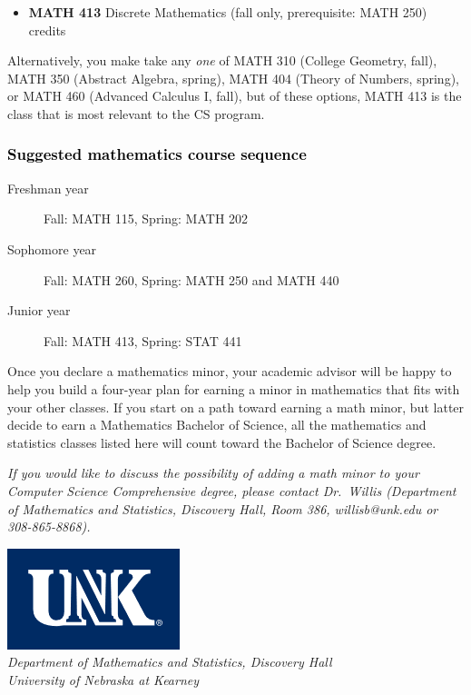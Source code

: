 \documentclass[9pt]{article}
\newenvironment{mypar}[2]
   {\begin{list}{}%
     {\setlength\leftmargin{#1}
     \setlength\rightmargin{#2}}
     \item[]}
   {\end{list}}
\begin{document}
\begin{itemize}
\item \textbf{MATH 413} Discrete Mathematics  (fall only, prerequisite: MATH 250) credits
\end{itemize}
\vspace{-0.1in}
\begin{mypar}{0.5cm}{0.5cm}
Alternatively, you make take any \emph{one} of MATH 310 (College Geometry, fall),  MATH 350 (Abstract Algebra, spring),  MATH 404  (Theory of Numbers, spring), or
MATH 460 (Advanced Calculus I, fall), but of these options, MATH 413 is  the class that is most relevant to the CS program.  \end{mypar}


\noindent


\subsubsection*{\textcolor{black}{Suggested mathematics course sequence}}

\begin{description}
   \item[\phantom{xxx} Freshman year] Fall: MATH 115, Spring:  MATH 202
      \item[\phantom{xxx} Sophomore year]  Fall: MATH 260,  Spring: MATH 250  and MATH 440
     \item[\phantom{xxx} Junior year]  Fall: MATH 413,  Spring: STAT 441
 \end{description}
  \vspace{0.1in}

 \noindent Once you declare a mathematics minor, your academic advisor will be happy to help you build a four-year plan for earning a minor in mathematics that fits with your other classes.  If you start on a path toward earning a math minor, but latter decide to earn a  Mathematics Bachelor of Science, all the mathematics and statistics  classes listed here will count toward the Bachelor of Science degree.

   \vspace{0.1in}

\noindent \textcolor{unkblue}{\emph{If you would like to discuss the possibility of  adding a math minor to your Computer Science Comprehensive degree, please contact \mbox{Dr.\ Willis} (Department of Mathematics and Statistics,  Discovery Hall, Room 386, willisb@unk.edu or 308-865-8868).}}


\newpage

\begin{flushleft}
\includegraphics[scale=0.25]{unk-logo}\\
 \emph{\textcolor{unkblue}{Department of Mathematics and Statistics, Discovery Hall}} \\
  \emph{\textcolor{unkblue}{University of Nebraska at Kearney}}
\end{flushleft}
\end{document}

